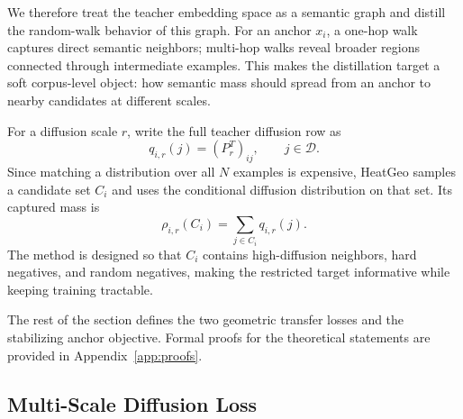 We therefore treat the teacher embedding space as a semantic graph and distill the random-walk behavior of this graph. For an anchor $x_i$, a one-hop walk captures direct semantic neighbors; multi-hop walks reveal broader regions connected through intermediate examples. This makes the distillation target a soft corpus-level object: how semantic mass should spread from an anchor to nearby candidates at different scales.

For a diffusion scale $r$, write the full teacher diffusion row as
\begin{equation}
    q_{i,r}(j) = (P_r^T)_{ij}, \qquad j\in\mathcal{D}.
\end{equation}
Since matching a distribution over all $N$ examples is expensive, HeatGeo samples a candidate set $C_i$ and uses the conditional diffusion distribution on that set. Its captured mass is
\begin{equation}
    \rho_{i,r}(C_i)=\sum_{j\in C_i}q_{i,r}(j).
\end{equation}
The method is designed so that $C_i$ contains high-diffusion neighbors, hard negatives, and random negatives, making the restricted target informative while keeping training tractable.

The rest of the section defines the two geometric transfer losses and the stabilizing anchor objective. Formal proofs for the theoretical statements are provided in Appendix~\ref{app:proofs}.

\subsection{Multi-Scale Diffusion Loss}

